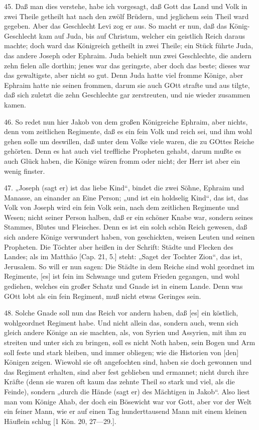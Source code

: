45. Daß man dies verstehe, habe ich vorgesagt, daß Gott das Land und Volk in zwei Theile getheilt hat nach den zwölf Brüdern, und jeglichem sein Theil ward gegeben. Aber das Geschlecht Levi zog er aus. So macht er nun, daß das König-Geschlecht kam auf Juda, bis auf Christum, welcher ein geistlich Reich daraus machte; doch ward das Königreich getheilt in zwei Theile; ein Stück führte Juda, das andere Joseph oder Ephraim. Juda behielt nun zwei Geschlechte, die andern zehn fielen alle dorthin; jenes war das geringste, aber doch das beste; dieses war das gewaltigste, aber nicht so gut. Denn Juda hatte viel fromme Könige, aber Ephraim hatte nie seinen frommen, darum sie auch GOtt strafte und aus tilgte, daß sich zuletzt die zehn Geschlechte gar zerstreuten, und nie wieder zusammen kamen.

46. So redet nun hier Jakob von dem großen Königreiche Ephraim, aber nichts, denn vom zeitlichen Regimente, daß es ein fein Volk und reich sei, und ihm wohl gehen solle um deswillen, daß unter dem Volke viele waren, die zu GOttes Reiche gehörten. Denn es hat auch viel treffliche Propheten gehabt, darum mußte es auch Glück haben, die Könige wären fromm oder nicht; der Herr ist aber ein wenig finster.

47. „Joseph (sagt er) ist das liebe Kind“, bindet die zwei Söhne, Ephraim und Manasse, an einander an Eine Person; „und ist ein holdselig Kind“, das ist, das Volk von Joseph wird ein fein Volk sein, nach dem zeitlichen Regimente und Wesen; nicht seiner Person halben, daß er ein schöner Knabe war, sondern seines Stammes, Blutes und Fleisches. Denn es ist ein solch schön Reich gewesen, daß sich andere Könige verwundert haben, von geschickten, weisen Leuten und seinen Propheten. Die Töchter aber heißen in der Schrift: Städte und Flecken des Landes; als im Matthäo [Cap. 21, 5.] steht: „Saget der Tochter Zion“, das ist, Jerusalem. So will er nun sagen: Die Städte in dem Reiche sind wohl geordnet im Regimente, [es] ist fein im Schwange und gutem Frieden gegangen, und wohl gediehen, welches ein großer Schatz und Gnade ist in einem Lande. Denn was GOtt lobt als ein fein Regiment, muß nicht etwas Geringes sein.

48. Solche Gnade soll nun das Reich vor andern haben, daß [es] ein köstlich, wohlgeordnet Regiment habe. Und nicht allein das, sondern auch, wenn sich gleich andere Könige an sie machten, als, von Syrien und Assyrien, mit ihm zu streiten und unter sich zu bringen, soll es nicht Noth haben, sein Bogen und Arm soll feste und stark bleiben, und immer obliegen; wie die Historien von [den] Königen zeigen. Wiewohl sie oft angefochten sind, haben sie doch gewonnen und das Regiment erhalten, sind aber fest geblieben und ermannet; nicht durch ihre Kräfte (denn sie waren oft kaum das zehnte Theil so stark und viel, als die Feinde), sondern „durch die Hände (sagt er) des Mächtigen in Jakob“. Also liest man vom Könige Ahab, der doch ein Bösewicht war vor Gott, aber vor der Welt ein feiner Mann, wie er auf einen Tag hunderttausend Mann mit einem kleinen Häuflein schlug [1 Kön. 20, 27—29.].


